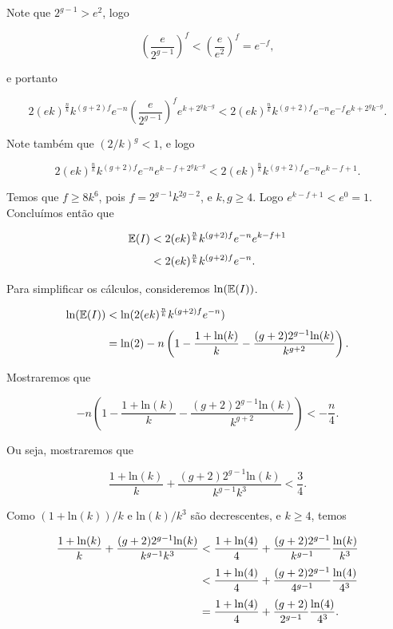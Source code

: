 Note que $2^{g-1} > e^2$, logo

\[\left(\frac{e}{2^{g-1}}\right)^f < \left(\frac{e}{e^2}\right)^f = e^{-f},\]

e portanto

\[2(ek)^{\frac{n}{k}} k^{(g+2)f} e^{-n} \left(\frac{e}{2^{g-1}}\right)^f e^{k+2^g k^{-g}} < 2(ek)^{\frac{n}{k}} k^{(g+2)f} e^{-n} e^{-f} e^{k+2^g k^{-g}}.\]

Note também que $(2/k)^g < 1$, e logo

\[2(ek)^{\frac{n}{k}} k^{(g+2)f} e^{-n} e^{k-f+2^g k^{-g}} < 2(ek)^{\frac{n}{k}} k^{(g+2)f} e^{-n} e^{k-f+1}.\]

Temos que $f \geq 8k^6$, pois $f = 2^{g-1}k^{2g-2}$, e $k,g \geq 4$. Logo $e^{k-f+1} < e^0 = 1$. Concluímos então que

\begin{equation*}
\setlength{\jot}{6pt}
\begin{aligned}
\bbe(I) &< 2(ek)^{\frac{n}{k}} k^{(g+2)f} e^{-n} e^{k-f+1} \\ 
&< 2(ek)^{\frac{n}{k}}k^{(g+2)f}e^{-n}.
\end{aligned}
\end{equation*}

Para simplificar os cálculos, consideremos $\text{ln}(\mathbb{E}(I))$.

\begin{equation*}
\setlength{\jot}{6pt}
\begin{aligned}
\text{ln}(\bbe(I)) &< \text{ln}(2(ek)^{\frac{n}{k}}k^{(g+2)f}e^{-n})\\
&= \text{ln}(2) -n\left(1 - \frac{1+\text{ln}(k)}{k} - \frac{(g+2)2^{g-1} \text{ln}(k)}{k^{g+2}}\right).
\end{aligned}
\end{equation*}

Mostraremos que 

\[-n\left(1 - \frac{1+\text{ln}(k)}{k} - \frac{(g+2)2^{g-1} \text{ln}(k)}{k^{g+2}}\right) < -\frac{n}{4}.\]

Ou seja, mostraremos que

\[\frac{1+\text{ln}(k)}{k} + \frac{(g+2)2^{g-1} \text{ln}(k)}{k^{g-1}k^3} < \frac{3}{4}.\]

Como $(1+\text{ln}(k))/k$ e $\text{ln}(k)/k^3$ são decrescentes, e $k \geq 4$, temos

\begin{equation*}
\setlength{\jot}{6pt}
\begin{aligned}
\frac{1+\text{ln}(k)}{k} + \frac{(g+2)2^{g-1} \text{ln}(k)}{k^{g-1}k^3} &< \frac{1+\text{ln}(4)}{4} + \frac{(g+2)2^{g-1}}{k^{g-1}}\frac{\text{ln}(k)}{k^3}\\
&< \frac{1+\text{ln}(4)}{4} + \frac{(g+2)2^{g-1}}{4^{g-1}}\frac{\text{ln}(4)}{4^3} \\
&= \frac{1+\text{ln}(4)}{4} + \frac{(g+2)}{2^{g-1}}\frac{\text{ln}(4)}{4^3}.
\end{aligned}
\end{equation*}

